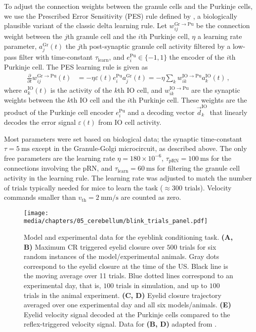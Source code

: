 To adjust the connection weights between the granule cells and the Purkinje cells, we use the Prescribed Error Sensitivity (PES) rule defined by \citet{macneil2011finetuning}, a biologically plausible variant of the classic delta learning rule.
Let $w^{\mathrm{Gr}\to\mathrm{Pu}}_{ij}$ be the connection weight between the $j$th granule cell and the $i$th Purkinje cell, $\eta$ a learning rate parameter, $a^\mathrm{Gr}_j(t)$ the $j$th post-synaptic granule cell activity filtered by a low-pass filter with time-constant $\tau_\mathrm{learn}$, and $e^\mathrm{Pu}_i \in \{-1, 1\}$ the encoder of the $i$th Purkinje cell.
The PES learning rule is given as
\begin{align*}
	\frac{\partial}{\partial t} w^{\mathrm{Gr}\to\mathrm{Pu}}_{ij}(t) &= -\eta \varepsilon(t) e^\mathrm{Pu}_i a^\mathrm{Gr}_j(t) = -\eta \sum_{k} w^{\mathrm{IO}\to\mathrm{Pu}}_{ik} a^\mathrm{IO}_k(t) \,,
\end{align*}
where $a^\mathrm{IO}_k(t)$ is the activity of the $k$th IO cell, and $w^{\mathrm{IO}\to\mathrm{Pu}}_{ik}$ are the synaptic weights between the $k$th IO cell and the $i$th Purkinje cell.
These weights are the product of the Purkinje cell encoder $e_i^\mathrm{Pu}$ and a decoding vector $\vec d_k^\mathrm{IO}$ that linearly decodes the error signal $\varepsilon(t)$ from IO cell activity.

Most parameters were set based on biological data; the synaptic time-constant $\tau = \SI{5}{\milli\second}$ except in the Granule-Golgi microcircuit, as described above.
The only free parameters are the learning rate $\eta=180\times 10^{-6}$, $\tau_\mathrm{pRN} = \SI{100}{\milli\second}$ for the connections involving the pRN, and $\tau_\mathrm{learn} = \SI{60}{\milli\second}$ for filtering the granule cell activity in the learning rule.
The learning rate was adjusted to match the number of trials typically needed for mice to learn the task ($\approx 300$ trials).
Velocity commands smaller than $v_\mathrm{th} = \SI{2}{\milli\metre\per\second}$ are counted as zero.

\begin{figure}
	\centering%
	\texttt{[image: media/chapters/05\_cerebellum/blink\_trials\_panel.pdf]}
	\caption[Model and experimental data for the eyeblink conditioning task]{Model and experimental data for the eyeblink conditioning task. \textbf{(A, B)} Maximum CR triggered eyelid closure over $500$ trials for six random instances of the model/experimental animals. Gray dots correspond to the eyelid closure at the time of the US. Black line is the moving average over 11 trials. Blue dotted lines correspond to an experimental day, that is, $100$ trials in simulation, and up to $100$ trials in the animal experiment. \textbf{(C, D)} Eyelid closure trajectory averaged over one experimental day and all six models/animals. \textbf{(E)} Eyelid velocity signal decoded at the Purkinje cells compared to the reflex-triggered velocity signal. Data for \textbf{(B, D)} adapted from \protect\citet{heiney2014cerebellardependent}.}
	\label{fig:result-basic}
\end{figure}

